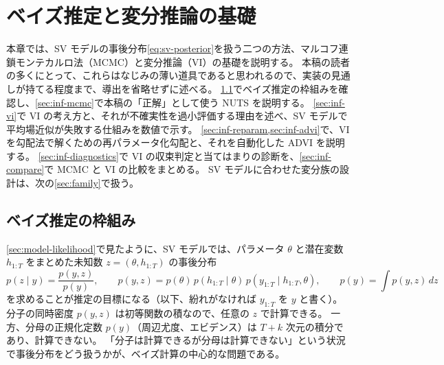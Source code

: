 \section{ベイズ推定と変分推論の基礎}\label{sec:inference}

本章では、SV モデルの事後分布\cref{eq:sv-posterior}を扱う二つの方法、マルコフ連鎖モンテカルロ法（MCMC）と変分推論（VI）の基礎を説明する。
本稿の読者の多くにとって、これらはなじみの薄い道具であると思われるので、実装の見通しが持てる程度まで、導出を省略せずに述べる。
\cref{sec:inf-bayes}でベイズ推定の枠組みを確認し、\cref{sec:inf-mcmc}で本稿の「正解」として使う NUTS を説明する。
\cref{sec:inf-vi}で VI の考え方と、それが不確実性を過小評価する理由を述べ、SV モデルで平均場近似が失敗する仕組みを数値で示す。
\cref{sec:inf-reparam,sec:inf-advi}で、VI を勾配法で解くための再パラメータ化勾配と、それを自動化した ADVI を説明する。
\cref{sec:inf-diagnostics}で VI の収束判定と当てはまりの診断を、\cref{sec:inf-compare}で MCMC と VI の比較をまとめる。
SV モデルに合わせた変分族の設計は、次の\cref{sec:family}で扱う。

\subsection{ベイズ推定の枠組み}\label{sec:inf-bayes}

\cref{sec:model-likelihood}で見たように、SV モデルでは、パラメータ $\theta$ と潜在変数 $h_{1:T}$ をまとめた未知数
$z = (\theta, h_{1:T})$ の事後分布
\[
  p(z \mid y) = \frac{p(y, z)}{p(y)}, \qquad p(y, z) = p(\theta)\, p(h_{1:T} \mid \theta)\, p(y_{1:T} \mid h_{1:T}, \theta), \qquad p(y) = \int p(y, z)\, dz
\]
を求めることが推定の目標になる（以下、紛れがなければ $y_{1:T}$ を $y$ と書く）。
分子の同時密度 $p(y, z)$ は初等関数の積なので、任意の $z$ で計算できる。
一方、分母の正規化定数 $p(y)$（周辺尤度、エビデンス）は $T + k$ 次元の積分であり、計算できない。
「分子は計算できるが分母は計算できない」という状況で事後分布をどう扱うかが、ベイズ計算の中心的な問題である。

